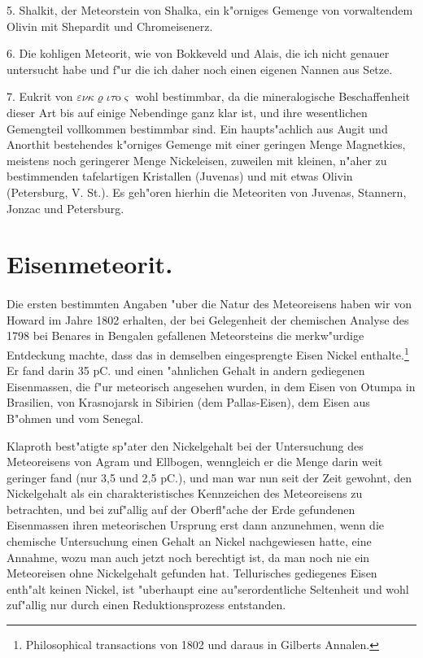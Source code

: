 \documentclass[a4paper, 11pt, oneside, german]{article}
\begin{document}
5. Shalkit, der Meteorstein von Shalka, ein k"orniges Gemenge von vorwaltendem Olivin mit Shepardit und Chromeisenerz.

6. Die kohligen Meteorit, wie von Bokkeveld und Alais, die ich nicht genauer untersucht habe und f"ur die ich daher noch einen eigenen Nannen aus Setze.

7. Eukrit von $\varepsilon\nu\kappa\varrho\iota\tau$o$\varsigma$ wohl bestimmbar, da die mineralogische Beschaffenheit dieser Art bis auf einige Nebendinge ganz klar ist, und ihre wesentlichen Gemengteil vollkommen bestimmbar sind. Ein haupts"achlich aus Augit und Anorthit bestehendes k"orniges Gemenge mit einer geringen Menge Magnetkies, meistens noch geringerer Menge Nickeleisen, zuweilen mit kleinen, n"aher zu bestimmenden tafelartigen Kristallen (Juvenas) und mit etwas Olivin (Petersburg, V. St.). Es geh"oren hierhin die Meteoriten von Juvenas, Stannern, Jonzac und Petersburg.
\clearpage
\section{Eisenmeteorit.}
\paragraph{}
Die ersten bestimmten Angaben "uber die Natur des Meteoreisens haben wir von Howard im Jahre 1802 erhalten, der bei Gelegenheit der chemischen Analyse des 1798 bei Benares in Bengalen gefallenen Meteorsteins die merkw"urdige Entdeckung machte, dass das in demselben eingesprengte Eisen Nickel enthalte.\footnote{Philosophical transactions von 1802 und daraus in Gilberts Annalen.} Er fand darin 35 pC. und einen "ahnlichen Gehalt in andern gediegenen Eisenmassen, die f"ur meteorisch angesehen wurden, in dem Eisen von Otumpa in Brasilien, von Krasnojarsk in Sibirien (dem Pallas-Eisen), dem Eisen aus B"ohmen und vom Senegal.

Klaproth best"atigte sp"ater den Nickelgehalt bei der Untersuchung des Meteoreisens von Agram und Ellbogen, wenngleich er die Menge darin weit geringer fand (nur 3,5 und 2,5 pC.), und man war nun seit der Zeit gewohnt, den Nickelgehalt als ein charakteristisches Kennzeichen des Meteoreisens zu betrachten, und bei zuf"allig auf der Oberfl"ache der Erde gefundenen Eisenmassen ihren meteorischen Ursprung erst dann anzunehmen, wenn die chemische Untersuchung einen Gehalt an Nickel nachgewiesen hatte, eine Annahme, wozu man auch jetzt noch berechtigt ist, da man noch nie ein Meteoreisen ohne Nickelgehalt gefunden hat. Tellurisches gediegenes Eisen enth"alt keinen Nickel, ist "uberhaupt eine au"serordentliche Seltenheit und wohl zuf"allig nur durch einen Reduktionsprozess entstanden.
\end{document}
